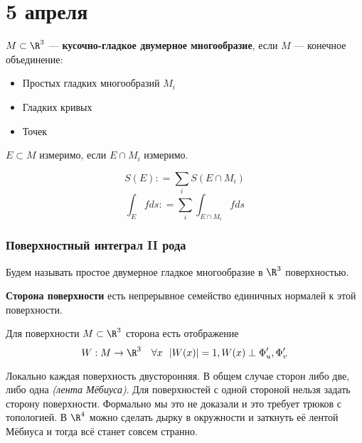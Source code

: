 \chapter{5 апреля}

\begin{definition}
    \(M \subset \R^3\) --- \textbf{кусочно-гладкое двумерное многообразие}, если \(M\) --- конечное объединение:
    \begin{itemize}
        \item Простых гладких многообразий \(M_i\)
        \item Гладких кривых
        \item Точек
    \end{itemize}
\end{definition}

\begin{definition}
    \(E \subset M\) измеримо, если \(E \cap M_i\) измеримо.

    \[S(E) : = \sum_i S(E \cap M_i)\]
    \[\int_E fds : = \sum_i \int_{E\cap M_i} f ds\]
\end{definition}

\subsection{Поверхностный интеграл II рода}

\begin{notation}
    Будем называть простое двумерное гладкое многообразие в \(\R^3\) поверхностью.
\end{notation}

\begin{definition}
    \textbf{Сторона поверхности} есть непрерывное семейство единичных нормалей к этой поверхности.

    Для поверхности \(M \subset \R^3\) сторона есть отображение
    \[W : M \to \R^3 \quad \forall x \ \ |W(x)|= 1, W(x) \perp \Phi'_u, \Phi'_v\]
\end{definition}

\begin{remark}
    Локально каждая поверхность двусторонняя. В общем случае сторон либо две, либо одна \textit{(лента Мёбиуса)}. Для поверхностей с одной стороной нельзя задать сторону поверхности. Формально мы это не доказали и это требует трюков с топологией. В \(\R^4\) можно сделать дырку в окружности и заткнуть её лентой Мёбиуса и тогда всё станет совсем странно.
\end{remark}

